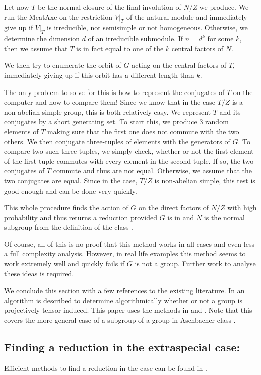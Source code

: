 Let now $T$ be the normal closure of the final involution of $N/Z$ we
produce. We run the MeatAxe on the restriction $V|_T$ of the natural module
and immediately give up if $V|_T$ is irreducible, not semisimple or not
homogeneous. Otherwise, we determine the dimension $d$ of an irreducible
submodule. If $n=d^k$ for some $k$, then we assume that $T$ is in fact
equal to one of the $k$ central factors of $N$.

We then try to enumerate the orbit of $G$ acting on the central factors of
$T$, immediately giving up if this orbit has a different length than $k$.

The only problem to solve for this is how to represent the conjugates of
$T$ on the computer and how to compare them! Since we know that in the 
case $T/Z$ is a non-abelian simple group, this is both relatively easy. We
represent $T$ and its conjugates by a short generating set. To start this,
we produce $3$ random elements of $T$ making sure that the first one does
not commute with the two others. We then conjugate three-tuples of elements
with the generators of $G$. To compare two such three-tuples, we simply
check, whether or not the first element of the first tuple commutes with
every element in the second tuple. If so, the two conjugates of $T$ commute
and thus are not equal. Otherwise, we assume that the two conjugates are
equal. Since in the  case, $T/Z$ is non-abelian simple, this test is
good enough and can be done very quickly.

This whole procedure finds the action of $G$ on the direct factors of $N/Z$
with high probability and thus returns a reduction provided $G$ is in 
and $N$ is the normal subgroup from the definition of the class .

Of course, all of this is no proof that this method works in all cases and
even less a full complexity analysis. However, in real life examples this
method seems to work extremely well and quickly fails if $G$ is not a  group.
Further work to analyse these ideas is required.

\smallskip
We conclude this section with a few references to the existing
literature. In \cite{RecogTensInd} an algorithm is described to
determine algorithmically whether or not a group is projectively
tensor induced. This paper uses the methods in \cite{tensprodproj} and
\cite{LGO97}. Note that this covers the more general case of a
subgroup of a group in Aschbacher class .


\subsection{Finding a reduction in the extraspecial case: }
\label{solveC6}

Efficient methods to find a reduction in the  case can be found in
\cite{C6FindHom}.

